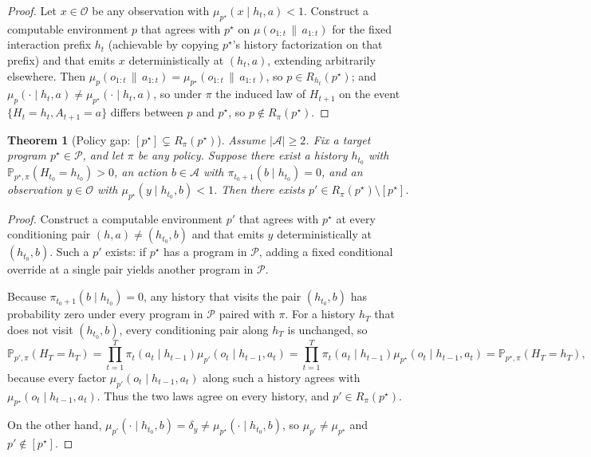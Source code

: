 \documentclass[11pt]{article}
\newtheorem{theorem}{Theorem}[section]
\theoremstyle{definition}
\theoremstyle{remark}
\newcommand{\Acal}{\mathcal{A}}
\newcommand{\Ocal}{\mathcal{O}}
\newcommand{\Pcal}{\mathcal{P}}
\newcommand{\Prob}{\mathbb{P}}
\newcommand{\givena}{\,\|\,}
\begin{document}
\begin{proof}
Let $x\in\Ocal$ be any observation with $\mu_{p^\star}(x\mid h_t,a)<1$. Construct a computable environment $p$ that agrees with $p^\star$ on $\mu(o_{1:t}\givena a_{1:t})$ for the fixed interaction prefix $h_t$ (achievable by copying $p^\star$'s history factorization on that prefix) and that emits $x$ deterministically at $(h_t,a)$, extending arbitrarily elsewhere. Then $\mu_p(o_{1:t}\givena a_{1:t})=\mu_{p^\star}(o_{1:t}\givena a_{1:t})$, so $p\in R_{h_t}(p^\star)$; and $\mu_p(\cdot\mid h_t,a)\neq \mu_{p^\star}(\cdot\mid h_t,a)$, so under $\pi$ the induced law of $H_{t+1}$ on the event $\{H_t=h_t,A_{t+1}=a\}$ differs between $p$ and $p^\star$, so $p\notin R_\pi(p^\star)$.
\end{proof}

\begin{theorem}[{Policy gap: $[p^\star]\subsetneq R_\pi(p^\star)$}]
\label{thm:policy-gap}
Assume $|\Acal|\ge 2$. Fix a target program $p^\star\in\Pcal$, and let $\pi$ be any policy. Suppose there exist a history $h_{t_0}$ with $\Prob_{p^\star,\pi}(H_{t_0}=h_{t_0})>0$, an action $b\in\Acal$ with $\pi_{t_0+1}(b\mid h_{t_0})=0$, and an observation $y\in\Ocal$ with $\mu_{p^\star}(y\mid h_{t_0},b)<1$. Then there exists $p'\in R_\pi(p^\star)\setminus [p^\star]$.
\end{theorem}

\begin{proof}
Construct a computable environment $p'$ that agrees with $p^\star$ at every conditioning pair $(h,a)\neq(h_{t_0},b)$ and that emits $y$ deterministically at $(h_{t_0},b)$. Such a $p'$ exists: if $p^\star$ has a program in $\Pcal$, adding a fixed conditional override at a single pair yields another program in $\Pcal$.

Because $\pi_{t_0+1}(b\mid h_{t_0})=0$, any history that visits the pair $(h_{t_0},b)$ has probability zero under every program in $\Pcal$ paired with $\pi$. For a history $h_T$ that does not visit $(h_{t_0},b)$, every conditioning pair along $h_T$ is unchanged, so
\[
\Prob_{p',\pi}(H_T=h_T)
=
\prod_{t=1}^T \pi_t(a_t\mid h_{t-1})\mu_{p'}(o_t\mid h_{t-1},a_t)
=
\prod_{t=1}^T \pi_t(a_t\mid h_{t-1})\mu_{p^\star}(o_t\mid h_{t-1},a_t)
=
\Prob_{p^\star,\pi}(H_T=h_T),
\]
because every factor $\mu_{p'}(o_t\mid h_{t-1},a_t)$ along such a history agrees with $\mu_{p^\star}(o_t\mid h_{t-1},a_t)$. Thus the two laws agree on every history, and $p'\in R_\pi(p^\star)$.

On the other hand, $\mu_{p'}(\cdot\mid h_{t_0},b)=\delta_y\neq \mu_{p^\star}(\cdot\mid h_{t_0},b)$, so $\mu_{p'}\neq\mu_{p^\star}$ and $p'\notin [p^\star]$.
\end{proof}
\end{document}
